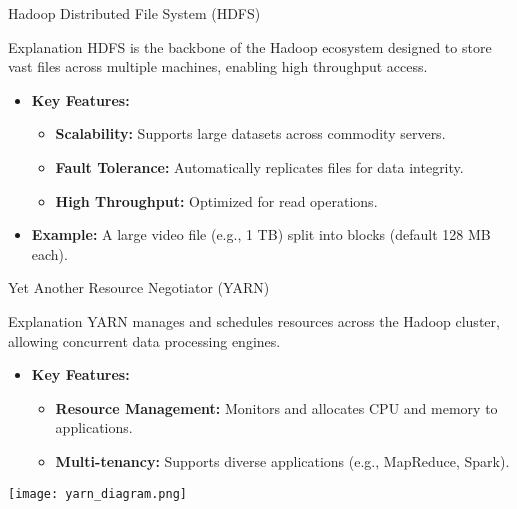 \documentclass[aspectratio=169]{beamer}
\begin{document}
\begin{frame}[fragile]{Hadoop Distributed File System (HDFS)}
    \begin{block}{Explanation}
        HDFS is the backbone of the Hadoop ecosystem designed to store vast files across multiple machines, enabling high throughput access.
    \end{block}
    
    \begin{itemize}
        \item \textbf{Key Features:}
        \begin{itemize}
            \item \textbf{Scalability:} Supports large datasets across commodity servers.
            \item \textbf{Fault Tolerance:} Automatically replicates files for data integrity.
            \item \textbf{High Throughput:} Optimized for read operations.
        \end{itemize}
        \item \textbf{Example:} A large video file (e.g., 1 TB) split into blocks (default 128 MB each).
    \end{itemize}
\end{frame}

\begin{frame}{Yet Another Resource Negotiator (YARN)}
    \begin{block}{Explanation}
        YARN manages and schedules resources across the Hadoop cluster, allowing concurrent data processing engines.
    \end{block}
    
    \begin{itemize}
        \item \textbf{Key Features:}
        \begin{itemize}
            \item \textbf{Resource Management:} Monitors and allocates CPU and memory to applications.
            \item \textbf{Multi-tenancy:} Supports diverse applications (e.g., MapReduce, Spark).
        \end{itemize}
    \end{itemize}
    
    \begin{center}
        \texttt{[image: yarn\_diagram.png]} %
    \end{center}
\end{frame}
\end{document}

